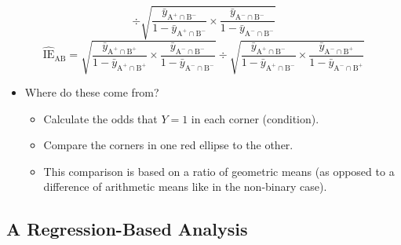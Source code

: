 \begin{itemize}
\[              \div \sqrt{\frac{\bar{y}_{\text{A}^+\cap \text{B}^-}}{1-\bar{y}_{\text{A}^+\cap \text{B}^-}}\times\frac{\bar{y}_{\text{A}^-\cap \text{B}^-}}{1-\bar{y}_{\text{A}^-\cap \text{B}^-}}} \]
          \[ \widehat{\text{IE}}_{\text{AB}}=\sqrt{\frac{\bar{y}_{\text{A}^+\cap \text{B}^+}}{1-\bar{y}_{\text{A}^+\cap \text{B}^+}}\times\frac{\bar{y}_{\text{A}^-\cap \text{B}^-}}{1-\bar{y}_{\text{A}^-\cap \text{B}^-}}}
              \div \sqrt{\frac{\bar{y}_{\text{A}^+\cap \text{B}^-}}{1-\bar{y}_{\text{A}^+\cap \text{B}^-}}\times\frac{\bar{y}_{\text{A}^-\cap \text{B}^+}}{1-\bar{y}_{\text{A}^-\cap \text{B}^+}}} \]
          \begin{itemize}[$\hookrightarrow$]
              \item Where do these come from?
                    \begin{itemize}
                        \item Calculate the odds that $ Y=1 $ in each corner (condition).
                        \item Compare the corners in one red ellipse to the other.
                        \item This comparison is based on a ratio of geometric means (as opposed to a difference of arithmetic means like in the non-binary case).
                    \end{itemize}
          \end{itemize}
\end{itemize}
\subsection{A Regression-Based Analysis}
